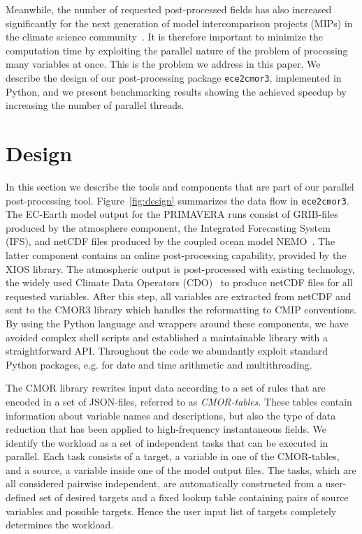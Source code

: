 \documentclass[procedia]{easychair}
\begin{document}
Meanwhile, the number of requested post-processed fields has also increased 
significantly for the next generation of model intercomparison projects (MIPs) 
in the climate 
science community~\cite{eyri:2016b}.
It is therefore important to minimize the 
computation time by 
exploiting the parallel nature of the problem of processing many variables at 
once.
This is the problem we address in this paper.  
We describe the design of our post-processing package \texttt{ece2cmor3}, 
implemented in Python, and 
we present benchmarking results showing the achieved speedup by increasing the 
number of parallel threads.


\section{Design}

In this section we describe the tools and components that 
are part of our parallel post-processing tool. Figure~\ref{fig:design} 
summarizes the data flow in \texttt{ece2cmor3}. 
% 
The EC-Earth model output for the PRIMAVERA runs consist of GRIB-files produced 
by the atmosphere component, the Integrated Forecasting System (IFS), and 
netCDF files produced by the coupled ocean model NEMO~\cite{NEMO}. The latter 
component 
contains an online post-processing capability, provided by the XIOS library. 
The 
atmospheric output is post-processed with existing technology, the widely used 
Climate Data Operators (CDO)~\cite{CDO} to produce netCDF files for all 
requested 
variables. After this step, all variables are extracted from netCDF and sent to 
the CMOR3 library \cite{CMOR} which handles the reformatting to CMIP 
conventions. By using the 
Python language and wrappers around these components, we have avoided 
complex shell scripts and established a maintainable library with a 
straightforward API. Throughout the code we abundantly exploit standard Python 
packages, e.g. for date and time arithmetic and multithreading.

The CMOR library rewrites input data according to a set of rules that are 
encoded in a set of JSON-files, referred to as \emph{CMOR-tables}. These tables 
contain information about variable names and descriptions, but also the type of 
data reduction that has been applied to high-frequency instantaneous fields. We 
identify the workload as a set of independent tasks that can be executed in 
parallel. Each task consists of a target, a variable in one of the CMOR-tables, 
and a source, a variable inside one of the model output files. The tasks, which 
are all considered pairwise independent, are automatically constructed from a 
user-defined set of desired targets and a fixed lookup table containing pairs of 
source variables and possible targets. Hence the user input list of targets 
completely determines the workload. 
\end{document}
